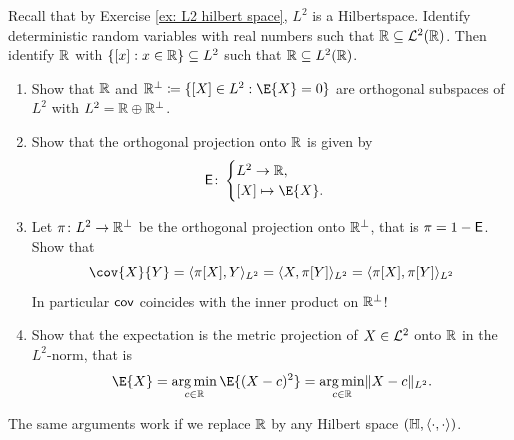 
\begin{exercise}[subtitle={Expectation -- Projection in \(L^2\) \Coffeecup\Coffeecup}]
    \label{ex: projection in L2}
    Recall that by Exercise \ref{ex: L2 hilbert space}, \(L^2\) is a Hilbertspace.
    Identify deterministic random variables with real numbers  such that \(\mathbb{R}
    \subseteq \mathcal{L}^2(\mathbb{R})\). Then identify \(\mathbb{R}\) with \(\{[x]:
    x\in\mathbb{R}\} \subseteq L^2\) such that \(\mathbb{R} \subseteq L^2(\mathbb{R})\).
    \begin{enumerate}[label=(\alph*), noitemsep]
        \item\label{it: (L2 projection) orthogonal decomposition}
        Show that \(\mathbb{R}\) and \(\real^\perp \coloneq \set{[X] \in L^2 :
        \E{X}=0}\) are orthogonal subspaces of \(L^2\) with \(L^2 = \mathbb{R}
        \oplus \mathbb{R}^\perp\).

        \item\label{it: (L2 projection) expectation is projection}
        Show that the orthogonal projection onto \(\mathbb{R}\) is given by
        \[
            \eSym \colon \begin{cases}
                L^2 \to \real,
                \\
                [X] \mapsto \E{X}.
            \end{cases}
        \]

        \item\label{it: (L2 projection) covariance is inner product}
        Let \(\pi \colon L^2 \to \mathbb{R}^\perp\) be the orthogonal projection
        onto \(\mathbb{R}^\perp\), that is \(\pi = 1 - \mathsf{E}\). Show that
        \[
            \cov{X}{Y}
            = \scp{\pi[X], Y}_{L^2}
            = \scp{X, \pi[Y]}_{L^2}
            = \scp{\pi[X], \pi[Y]}_{L^2}
        \]
        In particular \(\mathsf{cov}\) coincides with the inner product on \(\mathbb{R}^\perp\)!

        \item\label{it: (L2 projection) expectation is argmin}
        Show that the expectation is the metric projection of \(X\in
        \mathcal{L}^2\) onto \(\mathbb{R}\) in the \(L^2\)-norm, that is
        \[
            \E{X} = \argmin_{c\in \real} \E{(X - c)^2} = \argmin_{c\in \real} \norm{X - c}_{L^2}.
        \]
    \end{enumerate}
    \begin{remark}
        The same arguments work if we replace \(\mathbb{R}\) by any Hilbert space
        \((\mathbb{H}, \langle\cdot, \cdot\rangle)\).
    \end{remark}
\end{exercise}
